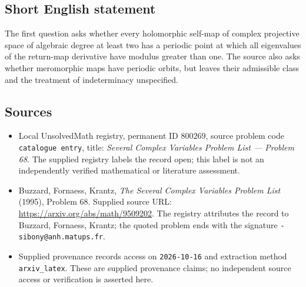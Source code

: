 \documentclass[11pt]{article}
\begin{document}
\subsection{Short English statement}
The first question asks whether every holomorphic self-map of complex projective space of algebraic degree at least two has a periodic point at which all eigenvalues of the return-map derivative have modulus greater than one. The source also asks whether meromorphic maps have periodic orbits, but leaves their admissible class and the treatment of indeterminacy unspecified.
\subsection{Sources}
\begin{itemize}
\item Local UnsolvedMath registry, permanent ID \(800269\), source problem code \texttt{catalogue entry}, title: \emph{Several Complex Variables Problem List --- Problem 68}. The supplied registry labels the record open; this label is not an independently verified mathematical or literature assessment.
\item Buzzard, Fornaess, Krantz, \emph{The Several Complex Variables Problem List} (1995), Problem 68. Supplied source URL: \url{https://arxiv.org/abs/math/9509202}. The registry attributes the record to Buzzard, Fornaess, Krantz; the quoted problem ends with the signature \texttt{-sibony@anh.matups.fr}.
\item Supplied provenance records access on \texttt{2026-10-16} and extraction method \texttt{arxiv\_latex}. These are supplied provenance claims; no independent source access or verification is asserted here.
\end{itemize}
\end{document}
